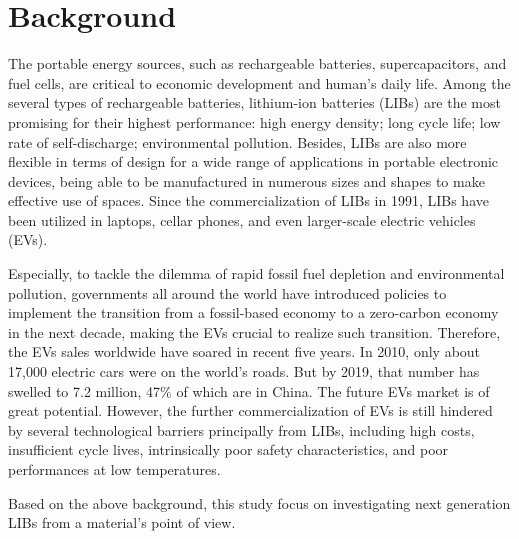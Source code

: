 \chapter*{Background}
The portable energy sources, such as rechargeable batteries, supercapacitors, and fuel cells, are critical to economic development and human's daily life. Among the several types of rechargeable batteries, lithium-ion batteries (LIBs) are the most promising for their highest performance: high energy density; long cycle life; low rate of self-discharge; environmental pollution. Besides, LIBs are also more flexible in terms of design for a wide range of applications in portable electronic devices, being able to be manufactured in numerous sizes and shapes to make effective use of spaces. Since the commercialization of LIBs in 1991, LIBs have been utilized in laptops, cellar phones, and even larger-scale electric vehicles (EVs). 

Especially, to tackle the dilemma of rapid fossil fuel depletion and environmental pollution, governments all around the world have introduced policies to implement the transition from a fossil-based economy to a zero-carbon economy in the next decade, making the EVs crucial to realize such transition. Therefore, the EVs sales worldwide have soared in recent five years. In 2010, only about 17,000 electric cars were on the world’s roads. But by 2019, that number has swelled to 7.2 million, 47\% of which are in China. The future EVs market is of great potential.
However, the further commercialization of EVs is still hindered by several technological barriers principally from LIBs, including high costs, insufficient cycle lives, intrinsically poor safety characteristics, and poor performances at low temperatures.  

Based on the above background, this study focus on investigating next generation LIBs from a material's point of view.
